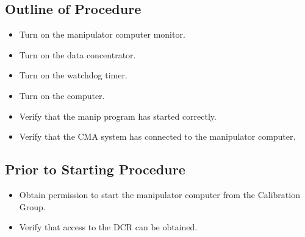 \documentclass[11pt]{article}
\begin{document}
\subsection{Outline of Procedure}
\begin{itemize}
\item Turn on the manipulator computer monitor.
\item Turn on the data concentrator.
\item Turn on the watchdog timer.
\item Turn on the computer.
\item Verify that the manip program has started correctly.
\item Verify that the CMA system has connected to the manipulator computer.
\end{itemize}

\subsection{Prior to Starting Procedure}
\begin{itemize}
\item Obtain permission to start the manipulator computer from the Calibration Group.
\item Verify that access to the DCR can be obtained.
\end{itemize}
\end{document}
